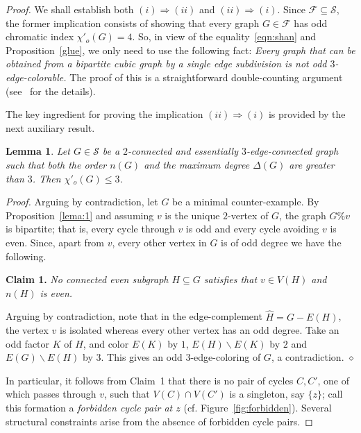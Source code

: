 \documentclass[a4paper,12pt]{article}
\newtheorem{lemma}[theorem]{Lemma}
\numberwithin{equation}{section}
\begin{document}
\begin{proof}
We shall establish both $(i)\Rightarrow (ii)$ and $(ii)\Rightarrow (i)$. Since $\mathcal{F}\subseteq \mathcal{S}$, the former implication consists of showing that every graph $G\in\mathcal{F}$ has odd chromatic index $\chi'_o(G)=4$. So, in view of the equality~\eqref{eqn:shan} and Proposition~\ref{glue}, we only need to use the following fact: \textit{Every graph that can be obtained from a bipartite cubic graph by a single edge subdivision is not odd $3$-edge-colorable.} The proof of this is a straightforward double-counting argument (see~\cite{AtaPetSkr16} for the details).

\smallskip

The key ingredient for proving the implication $(ii)\Rightarrow (i)$ is provided by the next auxiliary result.

\begin{lemma}
    \label{lema:2}
Let $G\in\mathcal{S}$ be a $2$-connected and essentially $3$-edge-connected graph such that both the order $n(G)$ and the maximum degree $\Delta(G)$ are greater than $3$. Then $\chi'_o(G)\leq3$.
\end{lemma}

\medskip

\noindent \textit{Proof.} Arguing by contradiction, let $G$ be a minimal counter-example. By Proposition~\ref{lema:1} and assuming $v$ is the unique $2$-vertex of $G$, the graph $G\%v$ is bipartite; that is, every cycle through $v$ is odd and every cycle avoiding $v$ is even. Since, apart from $v$, every other vertex in $G$ is of odd degree we have the following.

\bigskip

\noindent \textbf{Claim 1.} \textit{No connected even subgraph $H\subseteq G$ satisfies that $v\in V(H)$ and $n(H)$ is even.}

\medskip

\noindent Arguing by contradiction, note that in the edge-complement $\widehat{H}=G-E(H)$, the vertex $v$ is isolated whereas every other vertex has an odd degree. Take an odd factor $K$ of $H$, and color $E(K)$ by $1$, $E(H)\backslash E(K)$ by $2$ and $E(G)\backslash E(H)$ by $3$. This gives an odd $3$-edge-coloring of $G$, a contradiction.
\hfill$\diamond$

\bigskip

In particular, it follows from Claim~1 that there is no pair of cycles $C,C'$, one of which passes through $v$, such that $V(C)\cap V(C')$ is a singleton, say $\{z\}$; call this formation a \textit{forbidden cycle pair at $z$} (cf. Figure~\ref{fig:forbidden}).  Several structural constraints arise from the absence of forbidden cycle pairs.


\end{proof}
\end{document}
